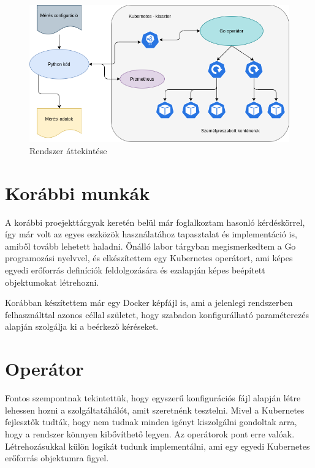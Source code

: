 \begin{figure}[!ht]
\centering
\includegraphics[width=150mm, keepaspectratio]{figures/system_overview.png}
\caption{Rendszer áttekintése}
\label{fig:system_overview}
\end{figure}

\section{Korábbi munkák}
A korábbi proejekttárgyak keretén belül már foglalkoztam hasonló kérdéskörrel, így már volt az egyes eszközök használatához tapasztalat és implementáció is, amiből tovább lehetett haladni. 
Önálló labor tárgyban megismerkedtem a Go programozási nyelvvel, és elkészítettem egy Kubernetes operátort, ami képes egyedi erőforrás definíciók feldolgozására és ezalapján képes beépített objektumokat létrehozni.

Korábban készítettem már egy Docker képfájl is, ami a jelenlegi rendszerben felhasználttal azonos céllal születet, hogy szabadon konfigurálható paraméterezés alapján szolgálja ki a beérkező kéréseket.

\section{Operátor}
Fontos szempontnak tekintettük, hogy egyszerű konfigurációs fájl alapján létre lehessen hozni a szolgáltatáhálót, amit szeretnénk tesztelni. 
Mivel a Kubernetes fejlesztők tudták, hogy nem tudnak minden igényt kiszolgálni gondoltak arra, hogy a rendszer könnyen kibővíthető legyen. Az operátorok pont erre valóak. Létrehozásukkal külön logikát tudunk implementálni, ami egy egyedi Kubernetes erőforrás objektumra figyel. 

